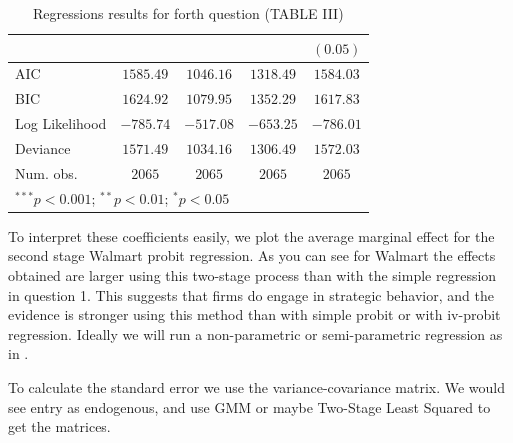 \documentclass{article}
\theoremstyle{definition}
\begin{document}
\begin{table}[h]
\begin{center}
\begin{tabular}{l c c c c}
                  &               &                &               & $(0.05)$       \\
\hline
AIC               & $1585.49$     & $1046.16$      & $1318.49$     & $1584.03$      \\
BIC               & $1624.92$     & $1079.95$      & $1352.29$     & $1617.83$      \\
Log Likelihood    & $-785.74$     & $-517.08$      & $-653.25$     & $-786.01$      \\
Deviance          & $1571.49$     & $1034.16$      & $1306.49$     & $1572.03$      \\
Num. obs.         & $2065$        & $2065$         & $2065$        & $2065$         \\
\hline
\multicolumn{5}{l}{\scriptsize{$^{***}p<0.001$; $^{**}p<0.01$; $^{*}p<0.05$}}
\end{tabular}
\caption{Regressions results for forth question (TABLE III)}
\label{tab:1}
\end{center}
\end{table}


To interpret these coefficients easily, we plot the average marginal effect for the second stage Walmart probit regression. As you can see for Walmart the effects obtained are larger using this two-stage process than with the simple regression in question 1. This suggests that firms do engage in strategic behavior, and the evidence is stronger using this method than with simple probit or with iv-probit regression.  Ideally we will run a non-parametric or semi-parametric regression as in \cite{bajari2010estimating}.

To calculate the standard error we use the variance-covariance matrix. We would see entry as endogenous, and use GMM or maybe Two-Stage Least Squared to get the matrices.







\end{document}
